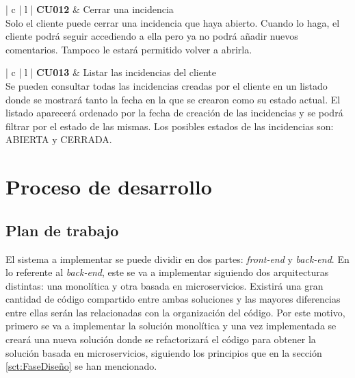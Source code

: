 \documentclass[11pt,spanish,listoffigures]{tfgetsinf}
\begin{document}
\begin{center}
\begin{tabular}{ | c | l | }
\hline
\textbf{ CU012 } & Cerrar una incidencia \\
\hline
{}
{
Solo el cliente puede cerrar una incidencia que haya abierto. Cuando lo haga, el cliente podrá seguir accediendo a ella pero ya no podrá añadir nuevos comentarios. Tampoco le estará permitido volver a abrirla.
} \\
\hline
\end{tabular}
\end{center}

\begin{center}
\begin{tabular}{ | c | l | }
\hline
\textbf{ CU013 } & Listar las incidencias del cliente \\
\hline
{}
{
Se pueden consultar todas las incidencias creadas por el cliente en un listado donde se mostrará tanto la fecha en la que se crearon como su estado actual. El listado aparecerá ordenado por la fecha de creación de las incidencias y se podrá filtrar por el estado de las mismas. Los posibles estados de las incidencias son: ABIERTA y CERRADA.
} \\
\hline
\end{tabular}
\end{center}

%

\chapter{Proceso de desarrollo}

\section{Plan de trabajo} \label{sct:PlanTrabajo}

El sistema a implementar se puede dividir en dos partes: \textit{front-end} y \textit{back-end}. En lo referente al \textit{back-end}, este se va a implementar siguiendo dos arquitecturas distintas: una monolítica y otra basada en microservicios. Existirá una gran cantidad de código compartido entre ambas soluciones y las mayores diferencias entre ellas serán las relacionadas con la organización del código. Por este motivo, primero se va a implementar la solución monolítica y una vez implementada se creará una nueva solución donde se refactorizará el código para obtener la solución basada en microservicios, siguiendo los principios que en la sección \ref{sct:FaseDiseño}  se han mencionado.
\end{document}
